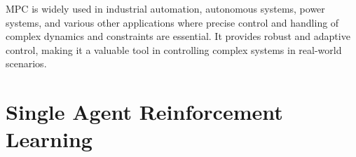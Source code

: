 MPC is widely used in industrial automation, autonomous systems, power systems, and various other applications where precise control and handling of complex dynamics and constraints are essential. It provides robust and adaptive control, making it a valuable tool in controlling complex systems in real-world scenarios.

%
%
%
\section{Single Agent Reinforcement Learning}\label{sec:single-agent-reinforcement-learning}
